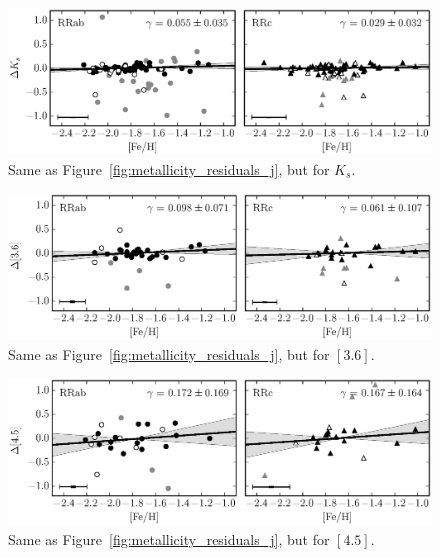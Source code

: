 \documentclass[a4paper,fleqn,usenatbib]{mnras}
\begin{document}
\begin{figure}
\begin{center}
\includegraphics[width=160mm]{../ocen_only_fitting/final_plots/metallicity_vs_residuals_K_sigclip.eps}
\caption{Same as Figure~\ref{fig:metallicity_residuals_j}, but for $K_s$.}
\label{fig:metallicity_residuals_k}
\end{center}
\end{figure}

\begin{figure}
\begin{center}
\includegraphics[width=160mm]{../ocen_only_fitting/final_plots/metallicity_vs_residuals_3_sigclip.eps}
\caption{Same as Figure~\ref{fig:metallicity_residuals_j}, but for $[3.6]$.}
\label{fig:metallicity_residuals_3}
\end{center}
\end{figure}

\begin{figure}
\begin{center}
\includegraphics[width=160mm]{../ocen_only_fitting/final_plots/metallicity_vs_residuals_4_sigclip.eps}
\caption{Same as Figure~\ref{fig:metallicity_residuals_j}, but for $[4.5]$.}
\label{fig:metallicity_residuals_4}
\end{center}
\end{figure}
\end{document}
